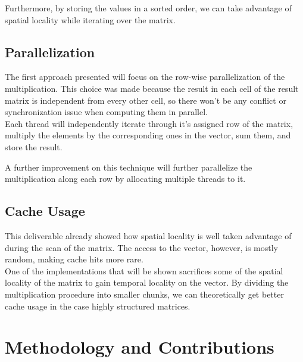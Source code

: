 \documentclass[conference]{IEEEtran}
\begin{document}
Furthermore, by storing the values in a sorted order, we can take advantage of spatial locality while iterating over the matrix.

\subsection{Parallelization}
The first approach presented will focus on the row-wise parallelization of the multiplication. This choice was made because the result in each cell of the result matrix is independent from every other cell, so there won't be any conflict or synchronization issue when computing them in parallel.\\
Each thread will independently iterate through it's assigned row of the matrix, multiply the elements by the corresponding ones in the vector, sum them, and store the result.

A further improvement on this technique will further parallelize the multiplication along each row by allocating multiple threads to it.

\subsection{Cache Usage}
This deliverable already showed how spatial locality is well taken advantage of during the scan of the matrix. The access to the vector, however, is mostly random, making cache hits more rare.\\
One of the implementations that will be shown sacrifices some of the spatial locality of the matrix to gain temporal locality on the vector. By dividing the multiplication procedure into smaller chunks, we can theoretically get better cache usage in the case highly structured matrices.


\section{Methodology and Contributions}\label{sec:methodology}
\end{document}
